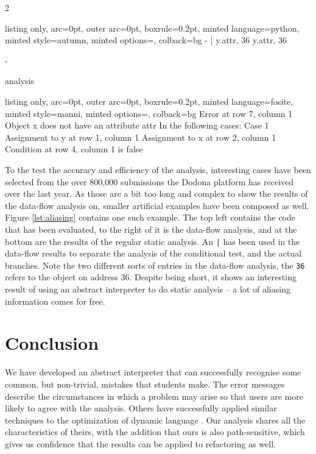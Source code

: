 \documentclass[a4paper, 11pt]{article}
\begin{document}
\begin{multicols*}{2}
\begin{figure*}[t]
\begin{minipage}{0.32\textwidth}
\begin{tcblisting}{listing only, 
    arc=0pt,
    outer arc=0pt, 
    boxrule=0.2pt,
    minted language=python,
    minted style=autumn,
    minted options={},
    colback=bg }
- | y.attr, 36
    y.attr, 36

-
\end{tcblisting}
 \end{minipage}
 \begin{minipage}{\textwidth}
 \vspace{4pt}
 analysis
  \begin{tcblisting}{listing only, 
    arc=0pt,
    outer arc=0pt, 
    boxrule=0.2pt,
    minted language=fosite,
    minted style=manni,
    minted options={},
    colback=bg }
Error at row 7, column 1
  Object x does not have an attribute attr
  In the following cases:
  Case 1
    Assignment to y at row 1, column 1
    Assignment to x at row 2, column 1
    Condition at row 4, column 1 is false
\end{tcblisting}
 \end{minipage}
 \label{lst:aliasing}
\end{figure*}

To the test the accuracy and efficiency of the analysis, interesting cases have been selected from the over 800,000 submissions the Dodona platform has received over the last year. As those are a bit too long and complex to show the results of the data-flow analysis on, smaller artificial examples have been composed as well. Figure \ref{lst:aliasing} contains one such example. The top left contains the code that has been evaluated, to the right of it is the data-flow analysis, and at the bottom are the results of the regular static analysis. An \texttt{|} has been used in the data-flow results to separate the analysis of the conditional test, and the actual branches. Note the two different sorts of entries in the data-flow analysis, the \texttt{36} refers to the object on address 36. Despite being short, it shows an interesting result of using an abstract interpreter to do static analysis -- a lot of aliasing information comes for free. 

\section{Conclusion}

We have developed an abstract interpreter that can successfully recognise some common, but non-trivial, mistakes that students make. The error messages describe the circumstances in which a problem may arise so that users are more likely to agree with the analysis. Others have successfully applied similar techniques to the optimization of dynamic language \cite{interpret}. Our analysis shares all the characteristics of theirs, with the addition that ours is also path-sensitive, which gives us confidence that the results can be applied to refactoring as well. 



 


\end{multicols*}
\end{document}
